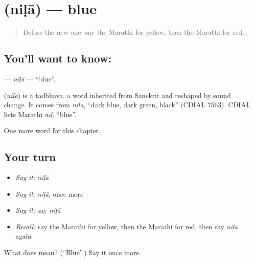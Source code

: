 \section[\texorpdfstring{\mr{निळा} (niḷā)}{निळा (niḷā)}]{ (niḷā) — blue}

\label{lesson:MR-C107-nila}



\begin{quote}
Before the new one: say the Marathi for yellow, then the Marathi for red.
\end{quote}

\subsection*{You'll want to know: }
\textbf{} — \emph{niḷā} — \textquotedblleft{}blue\textquotedblright{}.

\begin{cousinweb}
\textbf{} (\emph{niḷā}) is a tadbhava, a word inherited from Sanskrit and reshaped by sound change. It comes from \emph{nīla}, \textquotedblleft{}dark blue, dark green, black\textquotedblright{} (CDIAL 7563). CDIAL lists Marathi \emph{nīḷ}, \textquotedblleft{}blue\textquotedblright{}.
\end{cousinweb}

\begin{grammarlens}[title={What you've built}]
One more word for this chapter.
\end{grammarlens}

\subsection*{Your turn}
\begin{itemize}
\raggedright
  \item \emph{Say it:} \emph{niḷā}
  \item \emph{Say it:} \emph{niḷā}, once more
  \item \emph{Say it:} say \emph{niḷā}
  \item \emph{Recall:} say the Marathi for yellow, then the Marathi for red, then say \emph{niḷā} again
\end{itemize}

\begin{tcolorbox}[breakable,colback=teal!4,colframe=teal!35!black,title={Before you move on}]
What does  mean? (\textquotedblleft{}Blue\textquotedblright{}.) Say it once more.
\end{tcolorbox}
